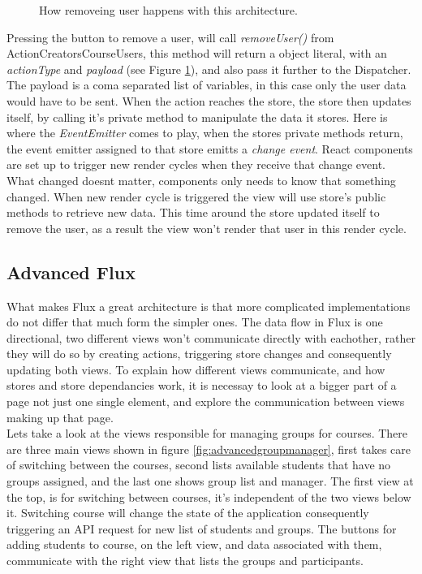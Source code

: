\begin{figure}[h]
  \scalebox{0.8}{}
  \caption{How removeing user happens with this architecture.}
  \label{fig:simplefluxremoveuser}
\end{figure}

Pressing the button to remove a user, will call \emph{removeUser()} from ActionCreatorsCourseUsers, this method will return a object literal, with an \emph{actionType} and \emph{payload} (see Figure \ref{fig:simplefluxremoveuser}), and also pass it further to the Dispatcher. The payload is a coma separated list of variables, in this case only the user data would have to be sent. When the action reaches the store, the store then updates itself, by calling it's private method to manipulate the data it stores. Here is where the \emph{EventEmitter} comes to play, when the stores private methods return, the event emitter assigned to that store emitts a \emph{change event}. React components are set up to trigger new render cycles when they receive that change event. What changed doesnt matter, components only needs to know that something changed. When new render cycle is triggered the view will use store's public methods to retrieve new data. This time around the store updated itself to remove the user, as a result the view won't render that user in this render cycle.

\subsection{Advanced Flux}\label{sec:advancedfluxexample}
What makes Flux a great architecture is that more complicated implementations do not differ that much form the simpler ones. The data flow in Flux is one directional, two different views won't communicate directly with eachother, rather they will do so by creating actions, triggering store changes and consequently updating both views. To explain how different views communicate, and how stores and store dependancies work, it is necessay to look at a bigger part of a page not just one single element, and explore the communication between views making up that page.
\\Lets take a look at the views responsible for managing groups for courses. There are three main views shown in figure \ref{fig:advancedgroupmanager}, first takes care of switching between the courses, second lists available students that have no groups assigned, and the last one shows group list and manager. The first view at the top, is for switching between courses, it's independent of the two views below it. Switching course will change the state of the application consequently triggering an API request for new list of students and groups. The buttons for adding students to course, on the left view, and data associated with them, communicate with the right view that lists the groups and participants.

